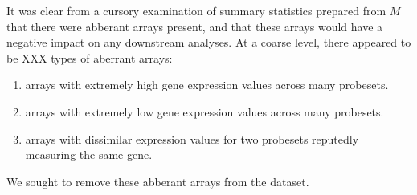 \documentclass{article}
\begin{document}
It was clear from a cursory examination of summary statistics prepared from $M$
that there were abberant arrays present, and that these arrays would have a
negative impact on any downstream analyses.  At a coarse level, there appeared
to be XXX types of aberrant arrays:

\renewcommand{\labelenumi}{\Alph{enumi}.}
\begin{enumerate}
\item arrays with extremely high gene expression values across many probesets.
\item arrays with extremely low gene expression values across many probesets.
\item arrays with dissimilar expression values for two probesets reputedly
measuring the same gene.
\end{enumerate}

We sought to remove these abberant arrays from the dataset.
\end{document}
